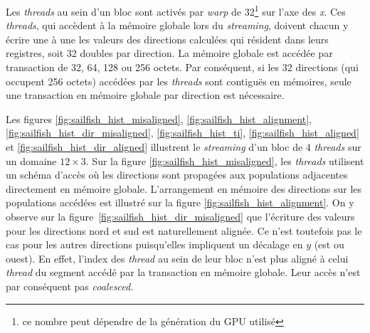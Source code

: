Les \textit{threads} au sein d'un bloc sont activés par \textit{warp} de 32\footnote{ce nombre peut dépendre de la génération du \ac{GPU} utilisé} sur l'axe des \textit{x}. Ces \textit{threads}, qui accèdent à la mémoire globale lors du \textit{streaming}, doivent chacun y écrire une à une les valeurs des directions calculées qui résident dans leurs registres, soit 32 doubles par direction. La mémoire globale est accédée par transaction de 32, 64, 128 ou 256 octets. Par conséquent, si les 32 directions (qui occupent 256 octets) accédées par les \textit{threads} sont contiguës en mémoires, seule une transaction en mémoire globale par direction est nécessaire. 

Les figures \ref{fig:sailfish_hist_misaligned}, \ref{fig:sailfish_hist_alignment}, \ref{fig:sailfish_hist_dir_misaligned}, \ref{fig:sailfish_hist_ti}, \ref{fig:sailfish_hist_aligned} et \ref{fig:sailfish_hist_dir_aligned} illustrent le \textit{streaming} d'un bloc de 4 \textit{threads} sur un domaine $12 \times 3$.
Sur la figure \ref{fig:sailfish_hist_misaligned}, les \textit{threads} utilisent un schéma d'accès où les directions sont propagées aux populations adjacentes directement en mémoire globale. L'arrangement en mémoire des directions sur les populations accédées est illustré sur la figure \ref{fig:sailfish_hist_alignment}. On y observe sur la figure~\ref{fig:sailfish_hist_dir_misaligned} que l'écriture des valeurs pour les directions nord et sud est naturellement alignée. Ce n'est toutefois pas le cas pour les autres directions puisqu'elles impliquent un décalage en $y$ (est ou ouest). En effet, l'index des \textit{thread} au sein de leur bloc n'est plus aligné à celui \textit{thread} du segment accédé par la transaction en mémoire globale. Leur accès n'est par conséquent pas \textit{coalesced}.

